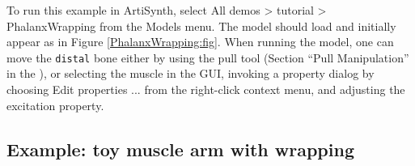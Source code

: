 To run this example in ArtiSynth, select {\sf All demos > tutorial >
PhalanxWrapping} from the {\sf Models} menu. The model should load and
initially appear as in Figure \ref{PhalanxWrapping:fig}.  When running
the model, one can move the {\tt distal} bone either
by using the pull tool (Section ``Pull
Manipulation'' in the
),
or selecting the muscle in the GUI, invoking a property dialog by
choosing {\sf Edit properties ...} from the right-click context menu,
and adjusting the {\sf excitation} property.

\subsection{Example: toy muscle arm with wrapping}
\label{ToyMuscleArm:sec}

